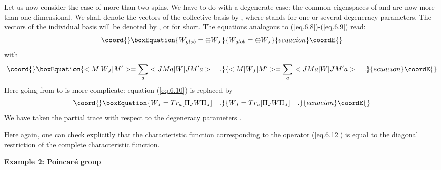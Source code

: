\documentclass[a4paper,11pt]{article}
\begin{document}
Let us now consider the case of more than two spins. We have to do with a degenerate case: the 
common eigenspaces of \coordHE{} and \coordHE{} are now more than one-dimensional. We shall denote the 
vectors 
of the collective basis by \coordHE{}, where \coordHE{} stands for one or several degeneracy parameters. 
The vectors of the individual basis will be denoted by \coordHE{}, or \coordHE{} for short. 
The equations analogous to (\ref{eq.6.8})-(\ref{eq.6.9}) read:
\begin{equation}\coord{}\boxEquation{
 \label{eq.6.12}
    W_{glob} = \oplus W_J
}{
 W_{glob} = \oplus W_J
}{ecuacion}\coordE{}\end{equation}
with
\begin{equation}\coord{}\boxEquation{
 \label{eq.6.13}
   <M | W_J | M'> = \sum_a <JMa | W | JM'a>  \quad .
}{
 <M | W_J | M'> = \sum_a <JMa | W | JM'a>  \quad .
}{ecuacion}\coordE{}\end{equation}
Here going from \coordHE{} to \coordHE{} is more complicate: equation (\ref{eq.6.10}) is replaced by
\begin{equation}\coord{}\boxEquation{
 \label{eq.6.14}
    W_J = Tr_a [\Pi_J W \Pi_J]  \quad .
}{
 W_J = Tr_a [\Pi_J W \Pi_J]  \quad .
}{ecuacion}\coordE{}\end{equation}
We have taken the partial trace with respect to the degeneracy parameters \coordHE{}.

Here again, one can check explicitly that the characteristic function corresponding to the 
operator (\ref{eq.6.12}) is equal to the diagonal restriction of the complete characteristic 
function.

{\bf Example 2: Poincar\'e group}
\end{document}
